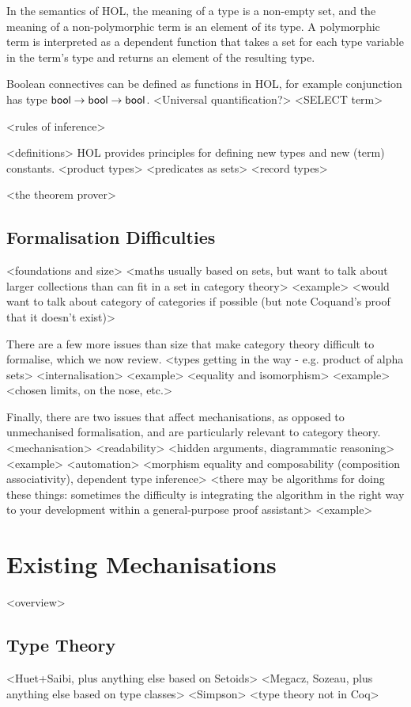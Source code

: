 \documentclass[twoside,titlepage,11pt]{article}
\begin{document}
In the semantics of HOL, the meaning of a type is a non-empty set, and the meaning of a non-polymorphic term is an element of its type.
A polymorphic term is interpreted as a dependent function that takes a set for each type variable in the term's type and returns an element of the resulting type.

Boolean connectives can be defined as functions in HOL, for example conjunction has type $\mathsf{bool}\to\mathsf{bool}\to\mathsf{bool}$.
<Universal quantification?>
<SELECT term>

<rules of inference>

<definitions>
HOL provides principles for defining new types and new (term) constants.
<product types>
<predicates as sets>
<record types>

<the theorem prover>%
\subsection{Formalisation Difficulties}%
<foundations and size>%
  <maths usually based on sets, but want to talk about larger collections than can fit in a set in category theory>
  <example>
  <would want to talk about category of categories if possible (but note Coquand's proof that it doesn't exist)>

There are a few more issues than size that make category theory difficult to formalise, which we now review.
<types getting in the way - e.g. product of alpha sets>
<internalisation>%
  <example>
<equality and isomorphism>%
  <example>
  <chosen limits, on the nose, etc.>

Finally, there are two issues that affect mechanisations, as opposed to unmechanised formalisation, and are particularly relevant to category theory.
<mechanisation>
  <readability>%
    <hidden arguments, diagrammatic reasoning>
    <example>
  <automation>%
    <morphism equality and composability (composition associativity), dependent type inference> 
    <there may be algorithms for doing these things: sometimes the difficulty is integrating the algorithm in the right way to your development within a general-purpose proof assistant>
    <example>
\section{Existing Mechanisations}%
<overview>%
\subsection{Type Theory}%
  <Huet+Saibi, plus anything else based on Setoids>%
  <Megacz, Sozeau, plus anything else based on type classes>%
  <Simpson>%
  <type theory not in Coq>%
\end{document}

